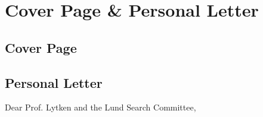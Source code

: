 \chapter{Cover Page \& Personal Letter}

\section{Cover Page} \label{sec:cover-page}
\noindent{}%

\clearpage
\section{Personal Letter} \label{sec:personal-letter}

\noindent Dear Prof. Lytken and the Lund Search Committee, \hfill {}
\vspace{0.5em}

